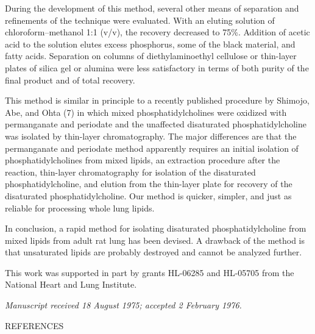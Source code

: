 \documentclass{article}
\begin{document}
During the development of this method, several other means of separation and refinements of the technique were evaluated. With an eluting solution of chloroform–methanol 1:1 (v/v), the recovery decreased to 75\%. Addition of acetic acid to the solution elutes excess phosphorus, some of the black material, and fatty acids. Separation on columns of diethylaminoethyl cellulose or thin-layer plates of silica gel or alumina were less satisfactory in terms of both purity of the final product and of total recovery.

This method is similar in principle to a recently published procedure by Shimojo, Abe, and Ohta (7) in which mixed phosphatidylcholines were oxidized with permanganate and periodate and the unaffected disaturated phosphatidylcholine was isolated by thin-layer chromatography. The major differences are that the permanganate and periodate method apparently requires an initial isolation of phosphatidylcholines from mixed lipids, an extraction procedure after the reaction, thin-layer chromatography for isolation of the disaturated phosphatidylcholine, and elution from the thin-layer plate for recovery of the disaturated phosphatidylcholine. Our method is quicker, simpler, and just as reliable for processing whole lung lipids.

In conclusion, a rapid method for isolating disaturated phosphatidylcholine from mixed lipids from adult rat lung has been devised. A drawback of the method is that unsaturated lipids are probably destroyed and cannot be analyzed further.

{\small\noindent This work was supported in part by grants HL-06285 and HL-05705 from the National Heart and Lung Institute.

\noindent\emph{Manuscript received 18 August 1975; accepted 2 February 1976.}\par}

\begin{center}
REFERENCES
\end{center}
\end{document}

